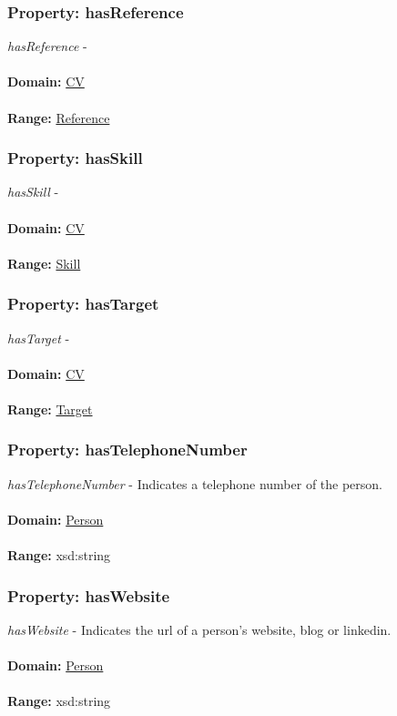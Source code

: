 \documentclass[a4paper,12pt]{article}
\numberwithin{equation}{section}
\begin{document}
\subsubsection{Property: hasReference}\hypertarget{hasReference}{}
\textit{hasReference} - 
\\\\
\textbf{Domain:} \hyperlink{CV}{CV} 
\\\\
\textbf{Range:}  \hyperlink{Reference}{Reference} 

\subsubsection{Property: hasSkill}\hypertarget{hasSkill}{}
\textit{hasSkill} - 
\\\\
\textbf{Domain:} \hyperlink{CV}{CV} 
\\\\
\textbf{Range:}  \hyperlink{Skill}{Skill} 

\subsubsection{Property: hasTarget}\hypertarget{hasTarget}{}
\textit{hasTarget} - 
\\\\
\textbf{Domain:} \hyperlink{CV}{CV} 
\\\\
\textbf{Range:}  \hyperlink{Target}{Target}


\subsubsection{Property: hasTelephoneNumber}\hypertarget{hasTelephoneNumber}{}
\textit{hasTelephoneNumber} - Indicates a telephone number of the person.
\\\\
\textbf{Domain:} \hyperlink{Person}{Person} 
\\\\
\textbf{Range:}  xsd:string

\subsubsection{Property: hasWebsite}\hypertarget{hasWebsite}{}
\textit{hasWebsite} - Indicates the url of a person's website, blog or linkedin.
\\\\
\textbf{Domain:} \hyperlink{Person}{Person} 
\\\\
\textbf{Range:}  xsd:string
\end{document}
